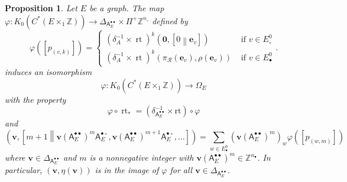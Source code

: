 \documentclass[12pt]{amsbook}%
\newcommand{\rt}{\operatorname{rt}}
\newcommand{\ee}{{\mathbf e}}
\renewcommand{\phi}{\varphi}
\newtheorem{propo}[theor]{Proposition}
\theoremstyle{defin}
\theoremstyle{remark}
\numberwithin{equation}{chapter}
\numberwithin{theor}{section}
\newcommand{\ZZ}{\mathbb{Z}}
\newcommand{\osX}{\Pi^+}
\newcommand{\oXe}[2]{\left[#1\left\|{#2}\right.\right]}
\newcommand{\regX}{{\bullet}}
\newcommand{\singX}{{\circ}}
\newcommand{\vv}{\mathbf{v}}
\newcommand{\oo}{{\mathbf 0}}
\newcommand{\nos}{{n_\singX}}
\newcommand{\nor}{{n_\regX}}
\newcommand{\pK}[1]{\pi_{\mathcal R}(#1)}
\newcommand{\adjRR}{\mathsf{A}^{\bullet\bullet}}
\newcommand{\adjRS}{\mathsf{A}^{\bullet\circ}}
\newcommand{\nDT}{\Omega}
\begin{document}
 \begin{propo}\label{premaster}
 Let $E$ be a graph.  The map $\phi:K_0( C^*(E \times_1 \ZZ))\to \Delta_{\adjRR_E}\times \osX\ZZ^{\nos}$ defined by
  \[
 \phi ( [p_{(v, k) } ] ) = \begin{cases} (\delta_A^{-1} \times \rt)^k  (\oo, \oXe{0}{\ee_v} ) &\text{ if } v\in E^0_\singX \\ (\delta_A^{-1} \times \rt)^k \left( \pK{\ee_v} , \rho( \ee_v) \right) &\text{ if } v \in E^0_\regX\end{cases}.
 \]
 induces an isomorphism
 \[
\phi:K_0( C^*(E \times_1 \ZZ))\to \nDT_E
\]
with the property 
\[
\phi\circ \rt_*= ( \delta_{\adjRR_E}^{-1}  \times \mathrm{rt})  \circ \phi
\]
and
\[
(\vv, \oXe{m+1}{ \vv (\adjRR_E)^m \adjRS_E, \vv (\adjRR_E)^{m+1}\adjRS_E, \dots} ) = \sum_{w \in E^0_\regX} (\vv (\adjRR_E)^m)_w  \phi( [ p_{(w,m)} ])
\] 
where $\vv \in \Delta_{\adjRR_E}$ and $m$ is a nonnegative integer with $\vv (\adjRR_E)^m \in \ZZ^{\nor}$.  In particular, $(\vv, \eta(\vv))$ is in the image of $\phi$ for all $\vv \in \Delta_{\adjRR_E}$.
\end{propo}
 
\end{document}
